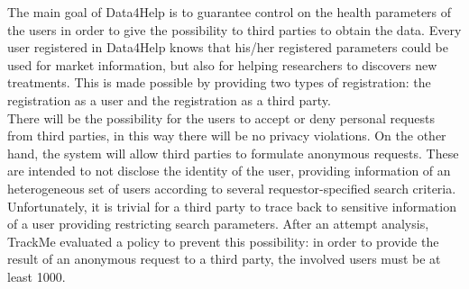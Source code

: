 {}
{}
The main goal of Data4Help is to guarantee control on the health parameters of the users in order to give the possibility to third parties to obtain the data. Every user registered in Data4Help knows that his/her registered parameters could be used for market information, but also for helping researchers to discovers new treatments. This is made possible by providing two types of registration: the registration as a user and the registration as a third party.\\
There will be the possibility for the users to accept or deny personal requests from third parties, in this way there will be no privacy violations. On the other hand, the system will allow third parties to formulate anonymous requests. These are intended to not disclose the identity of the user, providing information of an heterogeneous set of users according to several requestor-specified search criteria. Unfortunately, it is trivial for a third party to trace back to sensitive information of a user providing restricting search parameters. After an attempt analysis, TrackMe evaluated a policy to prevent this possibility: in order to provide the result of an anonymous request to a third party, the involved users must be at least 1000. 
 
